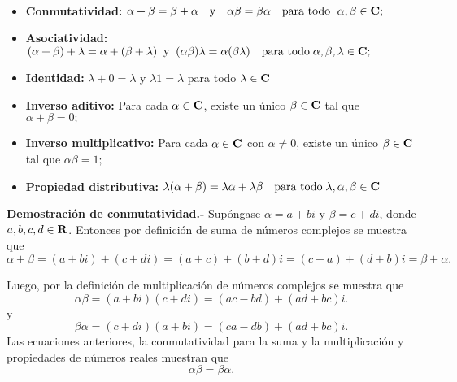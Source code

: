 \begin{tcolorbox}
    \begin{prop}\;\\
	\begin{itemize}
	    \item \textbf{Conmutatividad:}\;
		$\alpha + \beta = \beta + \alpha\quad \mbox{y}\quad \alpha \beta = \beta \alpha \quad \mbox{para todo }\; \alpha,\beta \in \bf{C};$

	    \item \textbf{Asociatividad:}\;
		$(\alpha + \beta )+\lambda = \alpha + (\beta + \lambda) \;\;\mbox{y}\;\; (\alpha\beta)\lambda =\alpha(\beta\lambda) \quad \mbox{para todo}\; \alpha,\beta,\lambda \in \bf{C};$

	    \item \textbf{Identidad:}\;
		$\lambda +0=\lambda $ y $\lambda 1 = \lambda$ para todo $\lambda \in \bf{C}$

	    \item \textbf{Inverso aditivo:}\;
		    Para cada $\alpha \in \bf{C}$, existe un único $\beta \in \bf{C}$ tal que $\alpha + \beta = 0;$

	    \item \textbf{Inverso multiplicativo:}\;
		    Para cada $\alpha \in \bf{C}$ con $\alpha \neq 0$, existe un único $\beta \in \bf{C}$ tal que $\alpha \beta = 1;$

	    \item \textbf{Propiedad distributiva:}\;
		$\lambda (\alpha + \beta) = \lambda \alpha + \lambda \beta \quad \mbox{para todo}\; \lambda, \alpha, \beta \in \bf{C}$
	\end{itemize}
    \end{prop}
\end{tcolorbox}

\textbf{Demostración de conmutatividad.-}\; Supóngase $\alpha=a+bi$ y $\beta=c+di$, donde $a,b,c,d \in \bf{R}$. Entonces por definición de suma de números complejos se muestra que
$$\alpha + \beta = (a+bi) + (c+di) = (a+c) + (b+d)i = (c+a) + (d+b)i = \beta + \alpha.$$

Luego, por la definición de multiplicación de números complejos se muestra que
$$\alpha \beta = (a+bi)(c+di) = (ac-bd)+(ad+bc)i.$$
y
$$\beta \alpha = (c+di)(a+bi) = (ca-db)+(ad+bc)i.$$
Las ecuaciones anteriores, la conmutatividad para la suma y la multiplicación y propiedades de números reales muestran que $$\alpha\beta = \beta \alpha.$$\\

